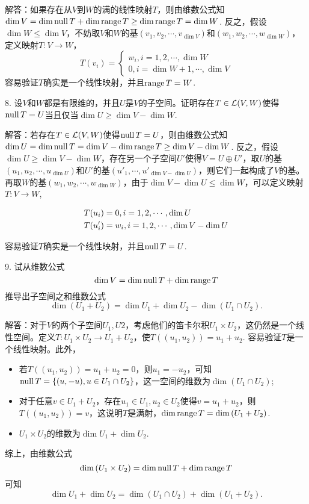 \documentclass[hyperref,]{ctexart}
\providecommand{\tightlist}{%
  \setlength{\itemsep}{0pt}\setlength{\parskip}{0pt}}
\begin{document}
\noindent{}
解答：如果存在从\(V\)到\(W\)的满的线性映射\(T\)，则由维数公式知\(\dim V =\dim\Null T+\dim \range T\ge \dim \range T=\dim W\).
反之，假设\(\dim W\le \dim V\)，不妨取\(V\)和\(W\)的基\((v_1,v_2,\cdots,v_{\dim V})\)和\((w_1,w_2,\cdots,w_{\dim W})\)，定义映射\(T: V\rightarrow W\)，
\[T(v_i)=
\begin{cases}
w_i, i=1,2,\cdots,\dim W\\
0, i=\dim W+1,\cdots,\dim V
\end{cases}
\] 容易验证\(T\)确实是一个线性映射，并且\(\range T=W\).

\bigskip

\noindent{} 8.
设\(V\)和\(W\)都是有限维的，并且\(U\)是\(V\)的子空间。证明存在\(T\in \calL(V,W)\)使得\(\Null T=U\)当且仅当\(\dim U\ge\dim V-\dim W\).

\noindent{}
解答：若存在\(T\in \calL(V,W)\)使得\(\Null T=U\)，则由维数公式知\(\dim U=\dim \Null T=\dim V-\dim \range T\ge \dim V-\dim W\).
反之，假设\(\dim U\ge\dim V-\dim W\)，存在另一个子空间\(U'\)使得\(V=U\oplus U'\)，取\(U\)的基\((u_1,u_2,\cdots,u_{\dim U})\)和\(U'\)的基\((u'_{1},\cdots,u'_{\dim V-\dim U})\)，则它们一起构成了\(V\)的基。再取\(W\)的基\((w_1,w_2,\cdots,w_{\dim W})\)，由于\(\dim V-\dim U\le\dim W\)，可以定义映射\(T:V\rightarrow W\),

\begin{equation}
\begin{aligned}
&T(u_i)=0,i=1,2,\cdots,\dim U\\
&T(u'_i)=w_i,i=1,2,\cdots,\dim V-\dim U\\
\end{aligned}\notag
\end{equation}

容易验证\(T\)确实是一个线性映射，并且\(\Null T=U\).

\bigskip

\noindent{} 9. 试从维数公式 \[\dim V=\dim \Null T+\dim \range T\]
推导出子空间之和维数公式
\[\dim(U_1+U_2)=\dim U_1+\dim U_2-\dim(U_1\cap U_2).\]

\noindent{}
解答：对于\(V\)的两个子空间\(U_1,U2\)，考虑他们的笛卡尔积\(U_1\times U_2\)，这仍然是一个线性空间。定义\(T:U_1\times U_2\rightarrow U_1+U_2\)，使\(T((u_1,u_2))=u_1+u_2\).
容易验证\(T\)是一个线性映射。此外，

\begin{itemize}
\tightlist
\item
  若\(T((u_1,u_2))=u_1+u_2=0\)，则\(u_1=-u_2\)，可知\(\Null T = \{(u,-u),u\in U_1\cap U_2\}\)，这一空间的维数为\(\dim (U_1\cap U_2)\);
\item
  对于任意\(v\in U_1+U_2\)，存在\(u_1\in U_1,u_2\in U_2\)使得\(v=u_1+u_2\)，则\(T((u_1,u_2))=v\)，这说明\(T\)是满射，\(\dim\range T=\dim (U_1+U_2)\).
\item
  \(U_1\times U_2\)的维数为\(\dim U_1+\dim U_2\).
\end{itemize}

综上，由维数公式 \[\dim (U_1\times U_2) = \dim \Null T+\dim \range T\]
可知 \[\dim U_1+\dim U_2=\dim(U_1\cap U_2)+\dim(U_1+U_2).\]
\end{document}
